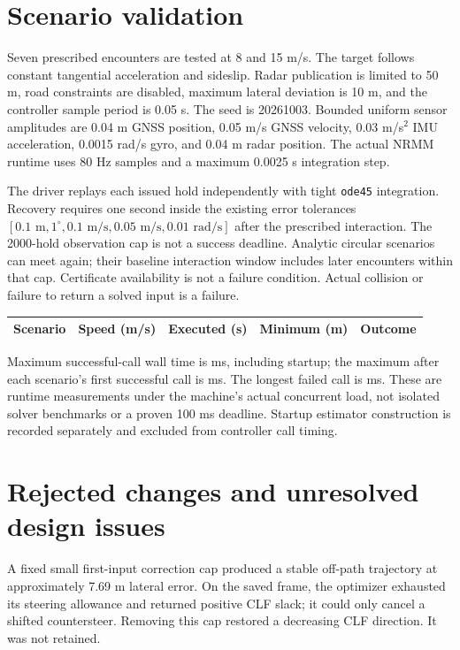 \documentclass[11pt]{article}
\begin{document}
\section{Scenario validation}
Seven prescribed encounters are tested at 8 and 15 m/s. The target follows
constant tangential acceleration and sideslip. Radar publication is limited
to 50 m, road constraints are disabled, maximum lateral deviation is 10 m,
and the controller sample period is 0.05 s. The seed is 20261003.
Bounded uniform sensor amplitudes are 0.04 m GNSS position,
0.05 m/s GNSS velocity, 0.03 m/s$^2$ IMU acceleration,
0.0015 rad/s gyro, and 0.04 m radar position. The actual NRMM runtime uses
80 Hz samples and a maximum 0.0025 s integration step.

The driver replays each issued hold independently with tight \texttt{ode45}
integration. Recovery requires one second inside the existing error
tolerances $[0.1\text{ m},1^\circ,0.1\text{ m/s},0.05\text{ m/s},0.01\text{ rad/s}]$
after the prescribed interaction. The 2000-hold observation cap is not a
success deadline. Analytic circular scenarios can meet again; their
baseline interaction window includes later encounters within that cap.
Certificate availability is not a failure condition. Actual collision or
failure to return a solved input is a failure.

\begin{longtable}{lr r r l}
\toprule
Scenario & Speed (m/s) & Executed (s) & Minimum (m) & Outcome \\\midrule
\endhead

\end{longtable}

Maximum successful-call wall time is \maximumCallMs{} ms, including startup;
the maximum after each scenario's first successful call is
\maximumWarmCallMs{} ms. The longest failed call is \maximumFailedCallMs{} ms.
These are runtime measurements under the machine's actual concurrent load,
not isolated solver benchmarks or a proven 100 ms deadline. Startup
estimator construction is recorded separately and excluded from controller
call timing.

\section{Rejected changes and unresolved design issues}
A fixed small first-input correction cap produced a stable off-path
trajectory at approximately 7.69 m lateral error. On the saved frame,
the optimizer exhausted its steering allowance and returned positive CLF
slack; it could only cancel a shifted countersteer. Removing this cap
restored a decreasing CLF direction. It was not retained.
\end{document}

